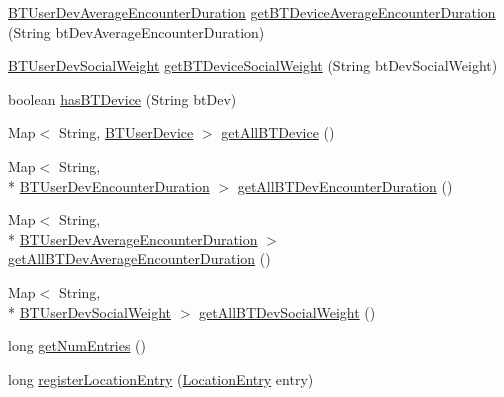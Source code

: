 \begin{DoxyCompactItemize}
\item 
\hyperlink{classcs_1_1nsense_1_1bluetooth_1_1_b_t_user_dev_average_encounter_duration}{B\-T\-User\-Dev\-Average\-Encounter\-Duration} \hyperlink{classcs_1_1nsense_1_1db_1_1_n_sense_data_source_a9271e02c9ddd8e639cf1508b1f2e526f}{get\-B\-T\-Device\-Average\-Encounter\-Duration} (String bt\-Dev\-Average\-Encounter\-Duration)
\item 
\hyperlink{classcs_1_1nsense_1_1bluetooth_1_1_b_t_user_dev_social_weight}{B\-T\-User\-Dev\-Social\-Weight} \hyperlink{classcs_1_1nsense_1_1db_1_1_n_sense_data_source_a669c392ea2394807cdba6318761a1df9}{get\-B\-T\-Device\-Social\-Weight} (String bt\-Dev\-Social\-Weight)
\item 
boolean \hyperlink{classcs_1_1nsense_1_1db_1_1_n_sense_data_source_a520ad66abd0990ce36797caf4dc36d69}{has\-B\-T\-Device} (String bt\-Dev)
\item 
Map$<$ String, \hyperlink{classcs_1_1nsense_1_1bluetooth_1_1_b_t_user_device}{B\-T\-User\-Device} $>$ \hyperlink{classcs_1_1nsense_1_1db_1_1_n_sense_data_source_adf89b96de2fb7bf69d3c4f4664d39efc}{get\-All\-B\-T\-Device} ()
\item 
Map$<$ String, \\*
\hyperlink{classcs_1_1nsense_1_1bluetooth_1_1_b_t_user_dev_encounter_duration}{B\-T\-User\-Dev\-Encounter\-Duration} $>$ \hyperlink{classcs_1_1nsense_1_1db_1_1_n_sense_data_source_abba7ad7abd24d38bc1b062a37deea0b0}{get\-All\-B\-T\-Dev\-Encounter\-Duration} ()
\item 
Map$<$ String, \\*
\hyperlink{classcs_1_1nsense_1_1bluetooth_1_1_b_t_user_dev_average_encounter_duration}{B\-T\-User\-Dev\-Average\-Encounter\-Duration} $>$ \hyperlink{classcs_1_1nsense_1_1db_1_1_n_sense_data_source_a13a044974f080266012fdbc31d630a95}{get\-All\-B\-T\-Dev\-Average\-Encounter\-Duration} ()
\item 
Map$<$ String, \\*
\hyperlink{classcs_1_1nsense_1_1bluetooth_1_1_b_t_user_dev_social_weight}{B\-T\-User\-Dev\-Social\-Weight} $>$ \hyperlink{classcs_1_1nsense_1_1db_1_1_n_sense_data_source_a5e272ec1a44f5207aeac3068eb3ca202}{get\-All\-B\-T\-Dev\-Social\-Weight} ()
\item 
long \hyperlink{classcs_1_1nsense_1_1db_1_1_n_sense_data_source_a5b648d77c804eebba6b95c55e60fb84e}{get\-Num\-Entries} ()
\item 
long \hyperlink{classcs_1_1nsense_1_1db_1_1_n_sense_data_source_a685b58cef7e8f03ac156be293b7ea824}{register\-Location\-Entry} (\hyperlink{classcs_1_1nsense_1_1location_1_1_location_entry}{Location\-Entry} entry)

\end{DoxyCompactItemize}

